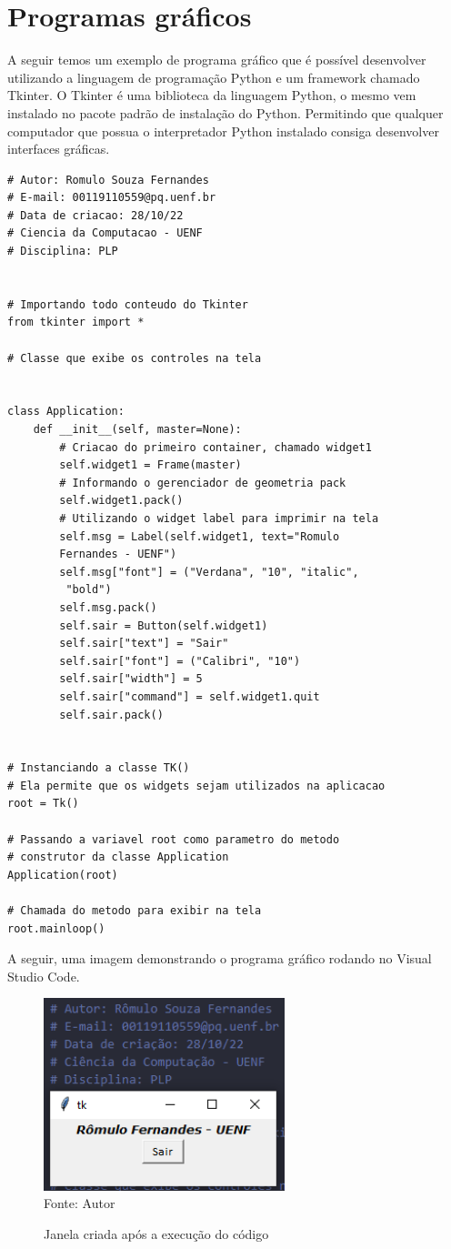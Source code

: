     \section{Programas gráficos}
     A seguir temos um exemplo de programa gráfico que é possível desenvolver utilizando a linguagem de programação Python e um framework chamado Tkinter. O Tkinter é uma biblioteca da linguagem Python, o mesmo vem instalado no pacote padrão de instalação do Python. Permitindo que qualquer computador que possua o interpretador Python instalado consiga desenvolver interfaces gráficas.
	\begin{lstlisting}
# Autor: Romulo Souza Fernandes
# E-mail: 00119110559@pq.uenf.br
# Data de criacao: 28/10/22
# Ciencia da Computacao - UENF
# Disciplina: PLP


# Importando todo conteudo do Tkinter
from tkinter import *

# Classe que exibe os controles na tela


class Application:
	def __init__(self, master=None):
		# Criacao do primeiro container, chamado widget1
		self.widget1 = Frame(master)
		# Informando o gerenciador de geometria pack
		self.widget1.pack()
		# Utilizando o widget label para imprimir na tela
		self.msg = Label(self.widget1, text="Romulo 
		Fernandes - UENF")
		self.msg["font"] = ("Verdana", "10", "italic",
		 "bold")
		self.msg.pack()
		self.sair = Button(self.widget1)
		self.sair["text"] = "Sair"
		self.sair["font"] = ("Calibri", "10")
		self.sair["width"] = 5
		self.sair["command"] = self.widget1.quit
		self.sair.pack()


# Instanciando a classe TK()
# Ela permite que os widgets sejam utilizados na aplicacao
root = Tk()

# Passando a variavel root como parametro do metodo
# construtor da classe Application
Application(root)

# Chamada do metodo para exibir na tela
root.mainloop()
	\end{lstlisting}
	A seguir, uma imagem demonstrando o programa gráfico rodando no Visual Studio Code.
	
	\begin{figure}[H]
		\begin{center}
			\caption{Janela criada após a execução do código} \label{ling1}
			\includegraphics[width=7cm]{grafico.PNG} \\
			{\tiny \sf Fonte:{ Autor}}
		\end{center}
	\end{figure}

